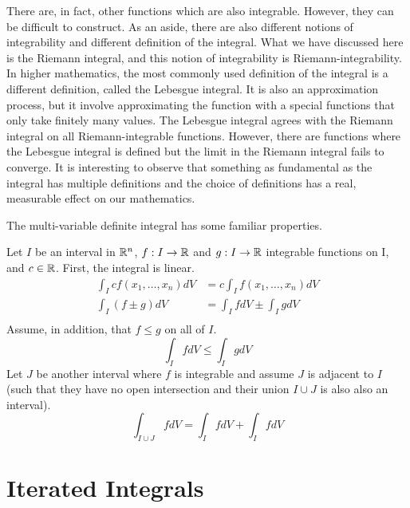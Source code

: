 \documentclass[fleqn,letterpaper]{report}
\begin{document}
There are, in fact, other functions which are also integrable.
However, they can be difficult to construct. As an aside,
there are also different notions of integrability and
different definition of the integral. What we have discussed
here is the Riemann integral, and this notion of integrability
is Riemann-integrability. In higher mathematics, the most
commonly used definition of the integral is a different
definition, called the Lebesgue integral. It is also an
approximation process, but it involve approximating the
function with a special functions that only take finitely many
values. The Lebesgue integral agrees with the Riemann
integral on all Riemann-integrable functions. However, there
are functions where the Lebesgue integral is defined but the
limit in the Riemann integral fails to converge. It is
interesting to observe that something as fundamental as the
integral has multiple definitions and the choice of
definitions has a real, measurable effect on our mathematics.

The multi-variable definite integral has some familiar
properties.

\begin{prop}
Let $I$ be an interval in $\mathbb{R}^n$, $f: I \rightarrow
\mathbb{R}$ and $g: I \rightarrow \mathbb{R}$ integrable functions on I,
and $c \in \mathbb{R}$. First, the integral is linear.
\begin{align*}
\int_I c f(x_1, \ldots, x_n) dV & = c \int_I f(x_1, \ldots,
x_n) dV \\
\int_I (f \pm g) dV & = \int_I f dV \pm \int_I g dV \\
\end{align*}
Assume, in addition, that $f \leq g$ on all of $I$. 
\begin{equation*}
\int_I f dV \leq \int_I g dV 
\end{equation*}
Let $J$ be another interval where $f$ is integrable and assume 
$J$ is adjacent to $I$ (such that they have no open intersection
and their union $I \cup J$ is also also an interval). 
\begin{equation*}
\int_{I \cup J} f dV = \int_I f dV + \int_I f dV
\end{equation*}
\end{prop}

\section{Iterated Integrals}
\label{iterated-integrals}
\end{document}
